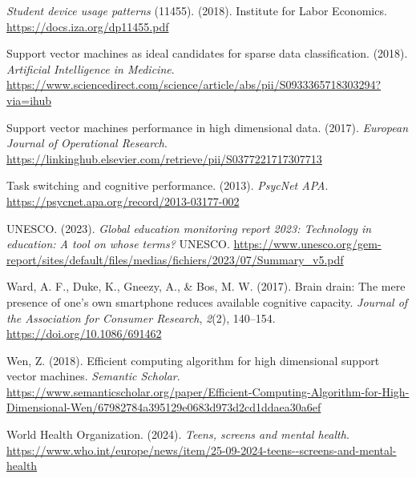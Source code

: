 \documentclass[
  titlepage]{article}
\newlength{\cslhangindent}
\newenvironment{CSLReferences}[2] %
 {\begin{list}{}{%
  \setlength{\itemindent}{0pt}
  \setlength{\leftmargin}{0pt}
  \setlength{\parsep}{0pt}
  \ifodd #1
   \setlength{\leftmargin}{\cslhangindent}
   \setlength{\itemindent}{-1\cslhangindent}
  \fi
  \setlength{\itemsep}{#2\baselineskip}}}
 {\end{list}}
\begin{document}
\begin{CSLReferences}{1}{0}
\emph{Student device usage patterns} (11455). (2018). Institute for
Labor Economics. \url{https://docs.iza.org/dp11455.pdf}

Support vector machines as ideal candidates for sparse data
classification. (2018). \emph{Artificial Intelligence in Medicine}.
\url{https://www.sciencedirect.com/science/article/abs/pii/S0933365718303294?via=ihub}

Support vector machines performance in high dimensional data. (2017).
\emph{European Journal of Operational Research}.
\url{https://linkinghub.elsevier.com/retrieve/pii/S0377221717307713}

Task switching and cognitive performance. (2013). \emph{PsycNet APA}.
\url{https://psycnet.apa.org/record/2013-03177-002}

UNESCO. (2023). \emph{Global education monitoring report 2023:
Technology in education: A tool on whose terms?} UNESCO.
\url{https://www.unesco.org/gem-report/sites/default/files/medias/fichiers/2023/07/Summary_v5.pdf}

Ward, A. F., Duke, K., Gneezy, A., \& Bos, M. W. (2017). Brain drain:
The mere presence of one's own smartphone reduces available cognitive
capacity. \emph{Journal of the Association for Consumer Research},
\emph{2}(2), 140--154. \url{https://doi.org/10.1086/691462}

Wen, Z. (2018). Efficient computing algorithm for high dimensional
support vector machines. \emph{Semantic Scholar}.
\url{https://www.semanticscholar.org/paper/Efficient-Computing-Algorithm-for-High-Dimensional-Wen/67982784a395129e0683d973d2cd1ddaea30a6ef}

World Health Organization. (2024). \emph{Teens, screens and mental
health}.
\url{https://www.who.int/europe/news/item/25-09-2024-teens--screens-and-mental-health}

\end{CSLReferences}
\end{document}
